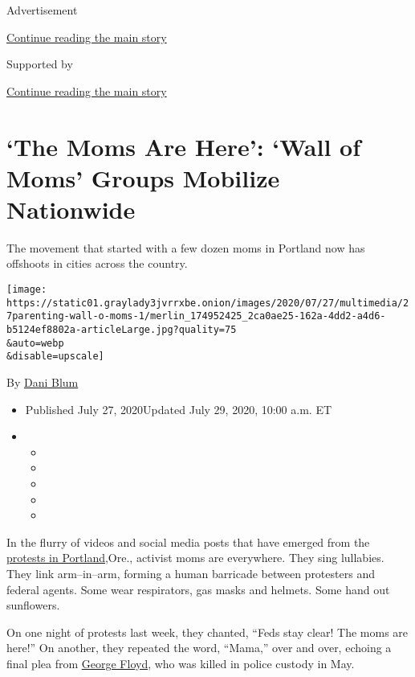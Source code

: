 Advertisement

\protect\hyperlink{after-top}{Continue reading the main story}

Supported by

\protect\hyperlink{after-sponsor}{Continue reading the main story}

\hypertarget{the-moms-are-here-wall-of-moms-groups-mobilize-nationwide}{%
\section{`The Moms Are Here': `Wall of Moms' Groups Mobilize
Nationwide}\label{the-moms-are-here-wall-of-moms-groups-mobilize-nationwide}}

The movement that started with a few dozen moms in Portland now has
offshoots in cities across the country.

\texttt{[image: https://static01.graylady3jvrrxbe.onion/images/2020/07/27/multimedia/27parenting-wall-o-moms-1/merlin\_174952425\_2ca0ae25-162a-4dd2-a4d6-b5124ef8802a-articleLarge.jpg?quality=75\\\&auto=webp\\\&disable=upscale]}

By \href{https://www.nytimes3xbfgragh.onion/by/dani-blum}{Dani Blum}

\begin{itemize}
\item
  Published July 27, 2020Updated July 29, 2020, 10:00 a.m. ET
\item
  \begin{itemize}
  \item
  \item
  \item
  \item
  \item
  \end{itemize}
\end{itemize}

In the flurry of videos and social media posts that have emerged from
the
\href{https://www.nytimes3xbfgragh.onion/video/us/100000007243995/portland-protests-federal-government.html}{protests
in Portland,}Ore., activist moms are everywhere. They sing lullabies.
They link arm--in--arm, forming a human barricade between protesters and
federal agents. Some wear respirators, gas masks and helmets. Some hand
out sunflowers.

On one night of protests last week, they chanted, ``Feds stay clear! The
moms are here!'' On another, they repeated the word, ``Mama,'' over and
over, echoing a final plea from
\href{https://www.nytimes3xbfgragh.onion/2020/05/31/us/george-floyd-investigation.html}{George
Floyd}, who was killed in police custody in May.

